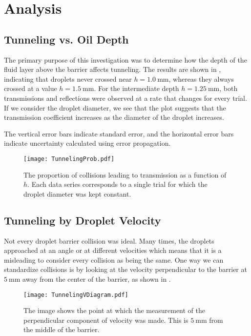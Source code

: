 \section{Analysis}


    \subsection{Tunneling vs. Oil Depth}
The primary purpose of this investigation was to determine how the depth of the fluid layer above the barrier affects tunneling. The results are shown in , indicating that droplets never crossed near $h=1.0~\mathrm{mm}$, whereas they always crossed at a value $h=1.5~\mathrm{mm}$. For the intermediate depth $h=1.25~\mathrm{mm}$, both transmissions and reflections were observed at a rate that changes for every trial. If we consider the droplet diameter, we see that the plot suggests that the transmission coefficient increases as the diameter of the droplet increases. 

The vertical error bars indicate standard error, and the horizontal error bars indicate uncertainty calculated using error propagation. 

\begin{figure}[h!]
	\centering
	\texttt{[image: TunnelingProb.pdf]}
	\caption{The proportion of collisions leading to transmission as a function of $h$. Each data series corresponds to a single trial for which the droplet diameter was kept constant.}
	\label{tbh}
\end{figure}


    \subsection{Tunneling by Droplet Velocity}
Not every droplet barrier collision was ideal. Many times, the droplets approached at an angle or at different velocities which means that it is a misleading to consider every collision as being the same. One way we can standardize collisions is by looking at the velocity perpendicular to the barrier at $5~\mathrm{mm}$ away from the center of the barrier, as shown in .

\begin{figure}[h!]
	\centering
	\texttt{[image: TunnelingVDiagram.pdf]}
	\caption{The image shows the point at which the measurement of the perpendicular component of velocity was made. This is $5~\mathrm{mm}$ from the middle of the barrier.}
	\label{tvd}
\end{figure}

